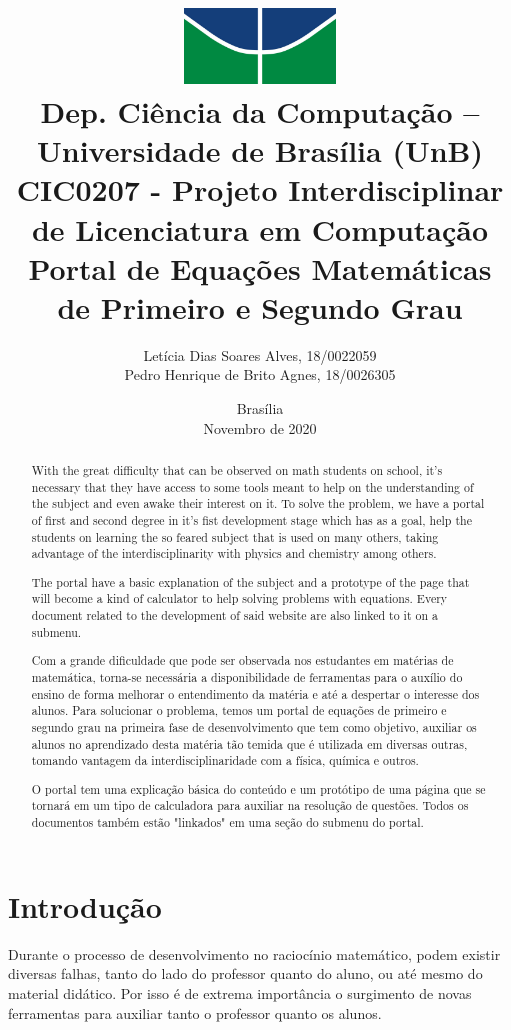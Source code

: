 \documentclass[12pt]{report}
\title{
        \includegraphics[width=4cm]{img/logo.jpg} \\ 
        \large
        Dep. Ciência da Computação -- Universidade de Brasília (UnB)\\
        CIC0207 - Projeto Interdisciplinar de Licenciatura em Computação \\
        \vfill 
        \vfill
        \LARGE
        \textbf{Portal de Equações Matemáticas de Primeiro e Segundo Grau}
    }
\author{
        Letícia Dias Soares Alves, 18/0022059\\
        Pedro Henrique de Brito Agnes, 18/0026305
    }
\affil{
        \vfill
        \vfill
        \vfill
        Professora \\
        Dr.a Letícia Lopes Leite
    }
\date{Brasília\\Novembro de 2020}
\begin{document}
\maketitle

\begin{abstract}
  With the great difficulty that can be observed on math students on school, it's necessary that they have access to some tools meant to help on the understanding of the subject and even awake their interest on it. To solve the problem, we have a portal of first and second degree in it's fist development stage which has as a goal, help the students on learning the so feared subject that is used on many others, taking advantage of the interdisciplinarity with physics and chemistry among others.

  The portal have a basic explanation of the subject and a prototype of the page that will become a kind of calculator to help solving problems with equations. Every document related to the development of said website are also linked to it on a submenu.
\end{abstract}

\begin{abstract}
  Com a grande dificuldade que pode ser observada nos estudantes em matérias de matemática, torna-se necessária a disponibilidade de ferramentas para o auxílio do ensino de forma melhorar o entendimento da matéria e até a despertar o interesse dos alunos. Para solucionar o problema, temos um portal de equações de primeiro e segundo grau na primeira fase de desenvolvimento que tem como objetivo, auxiliar os alunos no aprendizado desta matéria tão temida que é utilizada em diversas outras, tomando vantagem da interdisciplinaridade com a física, química e outros.

  O portal tem uma explicação básica do conteúdo e um protótipo de uma página que se tornará em um tipo de calculadora para auxiliar na resolução de questões. Todos os documentos também estão "linkados" em uma seção do submenu do portal.
\end{abstract}

\tableofcontents
\newpage

\chapter{Introdução}
Durante o processo de desenvolvimento no raciocínio matemático, podem existir diversas falhas, tanto do lado do professor quanto do aluno, ou até mesmo do material didático. Por isso é de extrema importância o surgimento de novas ferramentas para auxiliar tanto o professor quanto os alunos.
\end{document}
